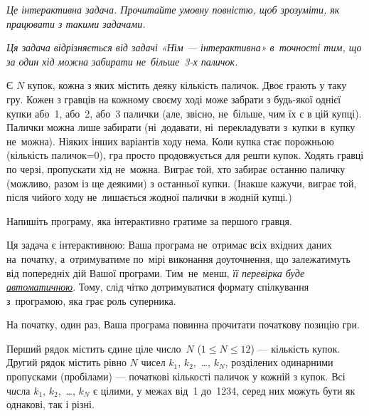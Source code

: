 ﻿{\it Це інтерактивна задача. Прочитайте умовну повністю, щоб зрозуміти, як працювати з такими задачами.}

{\it Ця задача відрізняється від задачі «Нім — інтерактивна» в~точності тим, що за один хід можна забирати не~більше~3-х паличок.}

Є $N$ купок, кожна з яких містить деяку кількість паличок.
Двоє грають у таку гру.
Кожен з гравців на кожному своєму ході може забрати з будь-якої однієї купки або~1, або~2, або~3 палички (але, звісно, не~більше, чим їх є в цій купці). Палички можна лише забирати (ні~додавати, ні~перекладувати з~купки в~купку не~можна).
Ніяких інших варіантів ходу нема. 
Коли купка стає порожньою (кількість паличок=0), гра просто продовжується для решти купок.
Ходять гравці по черзі, пропускати хід не~можна.
Виграє той, хто забирає останню паличку (можливо, разом із ще деякими) з останньої купки.
(Інакше кажучи, виграє той, після чийого ходу не~лишається жодної палички в жодній купці.)

Напишіть програму, яка інтерактивно гратиме за першого гравця. 

Ця задача є інтерактивною: 
Ваша програма не~отримає всіх вхідних даних на~початку,
а~отримуватиме по~мірі виконання доуточнення, 
що залежатимуть від попередніх дій Вашої програми. 
Тим~не~менш, {\it її перевірка буде
\underline{автоматичною}}. 
Тому, слід чітко дотримуватися формату спілкування з~програмою, яка грає роль суперника.



\Interaction

На початку, один раз, Ваша програма повинна прочитати початкову позицію гри.

Перший рядок містить єдине ціле число~$N$ ($1\leqslant N\leqslant 12$) --- кількість купок.
Др{\it у}гий рядок містить рівно $N$ чисел $k_1$, $k_2$,~\dots, $k_N$, розділених одинарними пропусками (пробілами) --- початкові кількості паличок у кожній з купок. Всі ч{\it и}сла $k_1$, $k_2$,~\dots, $k_N$ є цілими, у межах від~1 до~1234, серед них можуть бути як однакові, так і різні.

